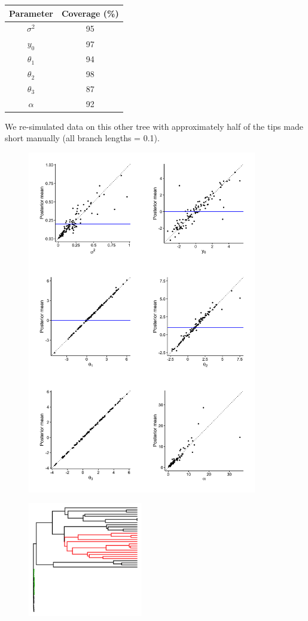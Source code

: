 \documentclass{article}
\begin{document}
\begin{center}
\begin{tabular}{c | c}
  Parameter & Coverage (\%) \\\hline
  $\sigma^2$ & 95\\
  $y_0$ & 97\\
  $\theta_1$ & 94\\
  $\theta_2$ & 98\\
  $\theta_3$ & 87\\
  $\alpha$ & 92
\end{tabular}
\end{center}

\clearpage
\noindent We re-simulated data on this other tree with approximately half of the tips made short manually (all branch lengths = 0.1).

\begin{figure}[h]
  \centering
  \includegraphics[width=10cm]{../OUMVNThreeOpt_nonultra_graphs.png}
\end{figure}

\begin{figure}[h]
  \centering
  \includegraphics[width=5cm]{../OUMVNThreeOpt_nonultra_tree.png}
\end{figure}
\end{document}
